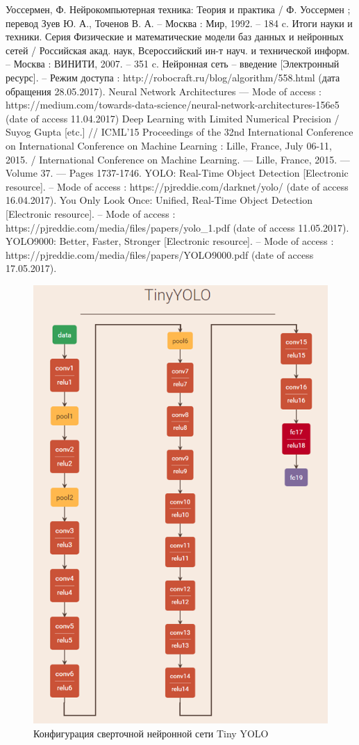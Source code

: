 \documentclass[a4paper,english,russian]{G2-105}
\begin{document}
\begin{thebibliography}{1}
     Уоссермен, Ф. Нейрокомпьютерная техника: Теория и практика / Ф. Уоссермен ; перевод Зуев Ю. А., Точенов В. А. – Москва : Мир, 1992. – 184 c.
     Итоги науки и техники. Серия Физические и математические модели баз данных и нейронных сетей / Российская акад. наук, Всероссийский ин-т науч. и технической информ. – Москва : ВИНИТИ, 2007. – 351 c.
	 Нейронная сеть – введение [Электронный ресурс]. – Режим доступа : http://robocraft.ru/blog/algorithm/558.html (дата обращения
28.05.2017).
     Neural Network Architectures — Mode of access :
https://medium.com/towards-data-science/neural-network-architectures-156e5
(date of access 11.04.2017)
     Deep Learning with Limited Numerical Precision / Suyog Gupta
[etc.] // ICML’15 Proceedings of the 32nd International Conference on
International Conference on Machine Learning : Lille, France, July 06-11,
2015. / International Conference on Machine Learning. — Lille, France, 2015. —  Volume 37. — Pages 1737-1746.
     YOLO: Real-Time Object Detection [Electronic resource]. – Mode
of access : https://pjreddie.com/darknet/yolo/ (date of access 16.04.2017).
     You Only Look Once: Unified, Real-Time Object Detection [Electronic resource]. – Mode of access : https://pjreddie.com/media/files/papers/yolo\_1.pdf (date of access 11.05.2017).
     YOLO9000: Better, Faster, Stronger [Electronic resource]. – Mode of access : https://pjreddie.com/media/files/papers/YOLO9000.pdf (date of access 17.05.2017). 
\end{thebibliography}
\begin{figure}
    \includegraphics[width=0.75\linewidth]{tinyyoloar.png}
    \caption{Конфигурация сверточной нейронной сети Tiny YOLO}
	\label{tinyyoloar}
\end{figure}
\end{document}

